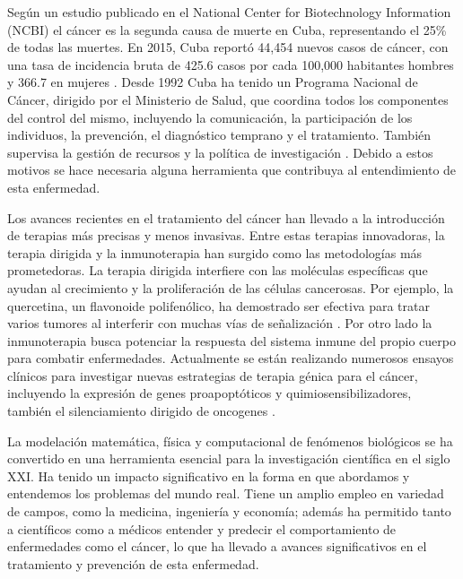 \hspace{.1cm}Según un estudio publicado en el National Center for Biotechnology Information (NCBI) el cáncer es la segunda causa de muerte en Cuba, representando el 25\% de todas las muertes. En 2015, Cuba reportó 44,454 nuevos casos de cáncer, con una tasa de incidencia bruta de 425.6 casos por cada 100,000 habitantes hombres y 366.7 en mujeres \cite{rubio2020}. Desde 1992 Cuba ha tenido un Programa Nacional de Cáncer, dirigido por el Ministerio de Salud, que coordina todos los componentes del control del mismo, incluyendo la comunicación, la participación de los individuos, la prevención, el diagnóstico temprano y el tratamiento. También supervisa la gestión de recursos y la política de investigación \cite{rubio2020}. Debido a estos motivos se hace necesaria alguna herramienta que contribuya al entendimiento de esta enfermedad.

\hspace{.1cm}Los avances recientes en el tratamiento del cáncer han llevado a la introducción de terapias más precisas y menos invasivas. Entre estas terapias innovadoras, la terapia dirigida y la inmunoterapia han surgido como las metodologías más prometedoras. La terapia dirigida interfiere con las moléculas específicas que ayudan al crecimiento y la proliferación de las células cancerosas. Por ejemplo, la quercetina, un flavonoide polifen\'olico, ha demostrado ser efectiva para tratar varios tumores al interferir con muchas vías de señalización \cite{soerjomataram2020}. Por otro lado la inmunoterapia busca potenciar la respuesta del sistema inmune del propio cuerpo para combatir enfermedades. Actualmente se están realizando numerosos ensayos clínicos para investigar nuevas estrategias de terapia génica para el cáncer, incluyendo la expresión de genes proapopt\'oticos y quimiosensibilizadores, también el silenciamiento dirigido de oncogenes \cite{seke2021}.

\hspace{.1cm}La modelación matemática, física y computacional de fenómenos biológicos se ha convertido en una herramienta esencial para la investigación científica en el siglo XXI. Ha tenido un impacto significativo en la forma en que abordamos y entendemos los problemas del mundo real. Tiene un amplio empleo en variedad de campos, como la medicina, ingeniería y economía; además ha permitido tanto a científicos como a médicos entender y predecir el comportamiento de enfermedades como el cáncer, lo que ha llevado a avances significativos en el tratamiento y prevención de esta enfermedad.

